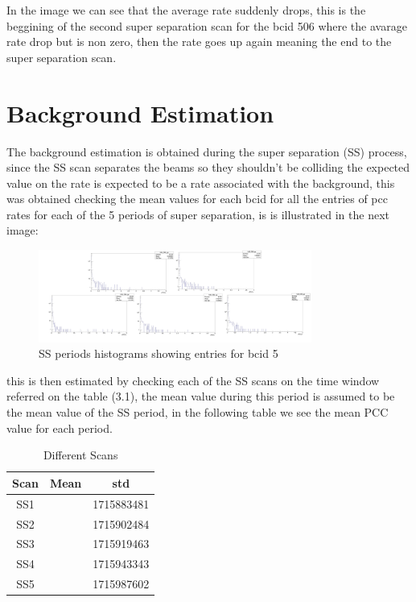 In the image we can see that the average rate suddenly drops, this is the beggining of the second super separation scan for the bcid 506 where the avarage rate drop but is non zero, then the rate goes up again meaning the end to the super separation scan.  

\section{Background Estimation}

The background estimation is obtained during the super separation (SS) process, since the SS scan separates the beams so they shouldn't be colliding the expected value on the rate is expected to be a rate associated with the background, this was obtained checking the mean values for each bcid for all the entries of pcc rates for each of the 5 periods of super separation, is is illustrated in the next image:

\begin{figure}[h]
    \centering
    \includegraphics[width=0.8\textwidth]{sshist.png}
    \caption{SS periods histograms showing entries for bcid 5 }
    \label{fig:SShist}
\end{figure}


this is then estimated by checking each of the SS scans on the time window referred on the table (3.1), the mean value during this period is assumed to be the mean value of the SS period, in the following table we see the mean PCC value for each period.  

\begin{table} [H]
\begin{center}
\caption{Different Scans}
\begin{tabular}{|c c c|} 
 \hline
 Scan & Mean & std  \\ [0.5ex] 
 \hline\hline
 SS1 &  & 1715883481  \\ 
 \hline
 SS2 &  & 1715902484  \\
 \hline
 SS3 &  & 1715919463 \\
 \hline
 SS4 &  & 1715943343  \\
 \hline
 SS5 &  & 1715987602  \\ [1.0ex]
 \hline
\end{tabular}
\end{center}
\end{table}

